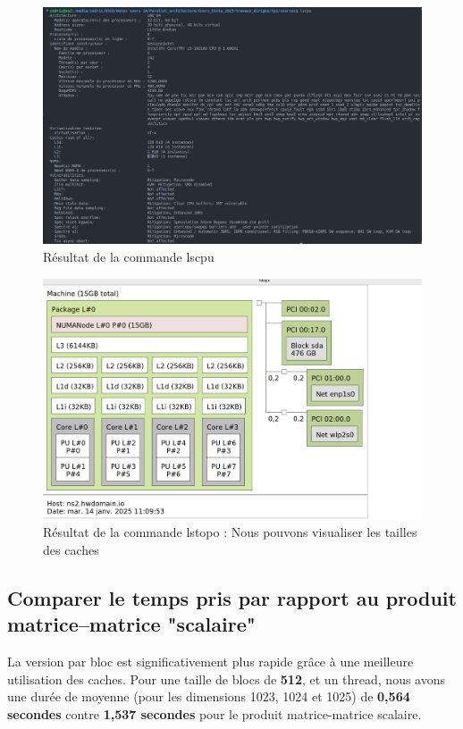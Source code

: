 \documentclass[a4paper,13pt]{book}
\begin{document}
\begin{figure}[!h]
    \begin{center}
    \includegraphics[scale=0.5]{../images/lscpu.png}
    \caption{Résultat de la commande lscpu}
    \label{tab:lscpu}
\end{center}
\end{figure}


\begin{figure}[!h]
    \begin{center}
        \includegraphics[scale=0.3]{../images/lstopo.png}
        \caption{Résultat de la commande lstopo : Nous pouvons visualiser les tailles des caches}
        \label{tab:ls_topo}
    \end{center}
\end{figure}
\clearpage
\subsection{Comparer le temps pris par rapport au produit matrice–matrice "scalaire"}
    La version par bloc est significativement plus rapide grâce à une meilleure utilisation des caches. Pour une taille de blocs de \textbf{512}, et un thread, nous avons une durée de moyenne (pour les dimensions 1023, 1024 et 1025) de \textbf{0,564 secondes}  contre \textbf{1,537 secondes} pour le produit matrice-matrice scalaire.
\end{document}
